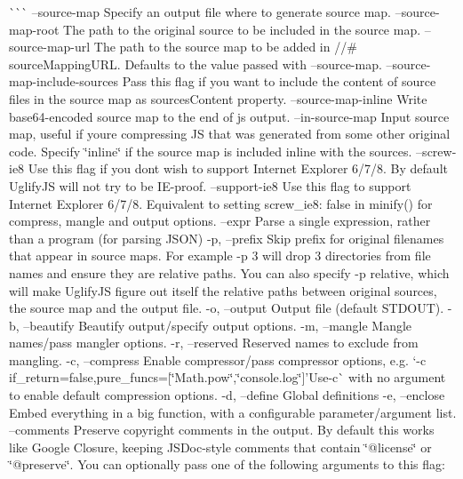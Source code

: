 \`{}\`{}\`{} --source-\/map Specify an output file where to generate source map. --source-\/map-\/root The path to the original source to be included in the source map. --source-\/map-\/url The path to the source map to be added in //\# source\+Mapping\+U\+RL. Defaults to the value passed with --source-\/map. --source-\/map-\/include-\/sources Pass this flag if you want to include the content of source files in the source map as sources\+Content property. --source-\/map-\/inline Write base64-\/encoded source map to the end of js output. --in-\/source-\/map Input source map, useful if you\textquotesingle{}re compressing JS that was generated from some other original code. Specify \char`\"{}inline\char`\"{} if the source map is included inline with the sources. --screw-\/ie8 Use this flag if you don\textquotesingle{}t wish to support Internet Explorer 6/7/8. By default Uglify\+JS will not try to be I\+E-\/proof. --support-\/ie8 Use this flag to support Internet Explorer 6/7/8. Equivalent to setting {\ttfamily screw\+\_\+ie8\+: false} in {\ttfamily minify()} for {\ttfamily compress}, {\ttfamily mangle} and {\ttfamily output} options. --expr Parse a single expression, rather than a program (for parsing J\+S\+ON) -\/p, --prefix Skip prefix for original filenames that appear in source maps. For example -\/p 3 will drop 3 directories from file names and ensure they are relative paths. You can also specify -\/p relative, which will make Uglify\+JS figure out itself the relative paths between original sources, the source map and the output file. -\/o, --output Output file (default S\+T\+D\+O\+UT). -\/b, --beautify Beautify output/specify output options. -\/m, --mangle Mangle names/pass mangler options. -\/r, --reserved Reserved names to exclude from mangling. -\/c, --compress Enable compressor/pass compressor options, e.\+g. `-\/c \textquotesingle{}if\+\_\+return=false,pure\+\_\+funcs=\mbox{[}\char`\"{}\+Math.\+pow\char`\"{},\char`\"{}console.\+log\char`\"{}\mbox{]}'{\ttfamily  Use}-\/c\`{} with no argument to enable default compression options. -\/d, --define Global definitions -\/e, --enclose Embed everything in a big function, with a configurable parameter/argument list. --comments Preserve copyright comments in the output. By default this works like Google Closure, keeping J\+S\+Doc-\/style comments that contain \char`\"{}@license\char`\"{} or \char`\"{}@preserve\char`\"{}. You can optionally pass one of the following arguments to this flag\+:
